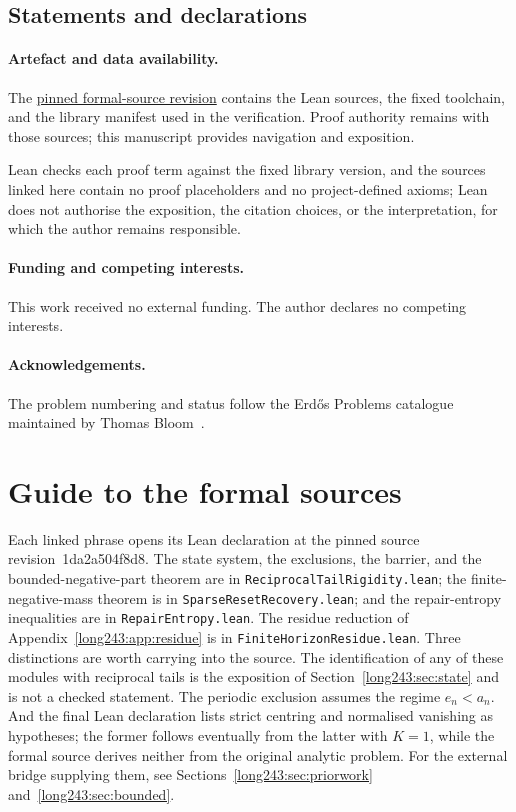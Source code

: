 \documentclass[11pt]{article}
\renewcommand{\commitshort}{1da2a504f8d8}
\begin{document}
\subsection*{Statements and declarations}

\paragraph{Artefact and data availability.} The
\href{\sourceurl}{pinned formal-source revision} contains the Lean sources, the
fixed toolchain, and the library manifest used in the verification.  Proof
authority remains with those sources; this manuscript provides navigation and
exposition.

Lean checks each proof term against the fixed library
version, and the sources linked here contain no proof placeholders and no
project-defined axioms; Lean does not authorise the exposition, the citation
choices, or the interpretation, for which the author remains responsible.

\paragraph{Funding and competing interests.} This work received no external
funding.  The author declares no competing interests.

\paragraph{Acknowledgements.} The problem numbering and status follow the
Erd\H{o}s Problems catalogue maintained by Thomas Bloom~\cite{erdosproblems}.

\appendix
\section{Guide to the formal sources}\label{long243:app:index}

Each linked phrase opens its Lean declaration at the pinned source
revision~\commitshort.  The state system, the exclusions, the barrier, and the
bounded-negative-part theorem are in \texttt{ReciprocalTailRigidity.lean}; the
finite-negative-mass theorem is in \texttt{SparseResetRecovery.lean}; and the
repair-entropy inequalities are in \texttt{RepairEntropy.lean}.  The residue
reduction of Appendix~\ref{long243:app:residue} is in
\texttt{FiniteHorizonResidue.lean}.  Three distinctions are worth carrying into
the source.  The
identification of any of these modules with reciprocal tails is the exposition
of Section~\ref{long243:sec:state} and is not a checked statement.  The periodic exclusion
assumes the regime $e_n<a_n$.  And the final Lean declaration lists strict
centring and normalised vanishing as hypotheses; the former follows eventually
from the latter with $K=1$, while the formal source derives neither from the
original analytic problem.  For the external bridge supplying them,
see Sections~\ref{long243:sec:priorwork} and~\ref{long243:sec:bounded}.
\end{document}
